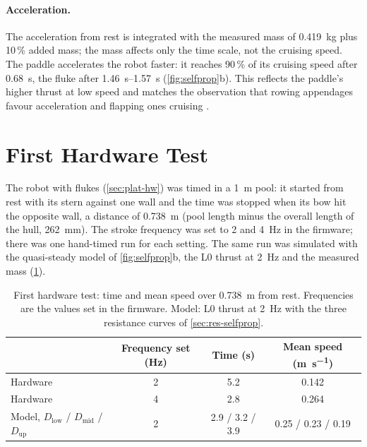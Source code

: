 \paragraph{Acceleration.} The acceleration from rest is integrated with the measured mass of \SI{0.419}{\kilo\gram} plus 10\,\% added
mass; the mass affects only the time scale, not the cruising speed. The paddle accelerates the robot faster: it reaches 90\,\% of its cruising speed after
\SI{0.68}{\second}, the fluke after \SIrange{1.46}{1.57}{\second} (\cref{fig:selfprop}b). This reflects the paddle's higher thrust at low
speed and matches the observation that rowing appendages favour acceleration and flapping ones cruising
\cite{Walker2000}.

\section{First Hardware Test}
\label{sec:res-hw}

The robot with flukes (\cref{sec:plat-hw}) was timed in a \SI{1}{\metre} pool: it started from rest with its stern against one
wall and the time was stopped when its bow hit the opposite wall, a distance of \SI{0.738}{\metre} (pool length minus the overall
length of the hull, \SI{262}{\milli\metre}). The stroke frequency was set to \SI{2}{} and \SI{4}{\hertz} in the firmware; there was
one hand-timed run for each setting. The same run was simulated with the quasi-steady model of \cref{fig:selfprop}b, the L0 thrust at
\SI{2}{\hertz} and the measured mass (\cref{tab:hw}).

\begin{table}[htb]
  \centering
  \caption[First hardware test]{First hardware test: time and mean speed over \SI{0.738}{\metre} from rest. Frequencies are the
    values set in the firmware. Model: L0 thrust at \SI{2}{\hertz} with the three resistance curves of \cref{sec:res-selfprop}.}
  \label{tab:hw}
  \small
  \begin{tabular}{@{}lccc@{}}
    \toprule
    & Frequency set (Hz) & Time (s) & Mean speed (\si{\metre\per\second}) \\
    \midrule
    Hardware & 2 & 5.2 & 0.142 \\
    Hardware & 4 & 2.8 & 0.264 \\
    Model, $D_\text{low}$ / $D_\text{mid}$ / $D_\text{up}$ & 2 & 2.9 / 3.2 / 3.9 & 0.25 / 0.23 / 0.19 \\
    \bottomrule
  \end{tabular}
\end{table}


